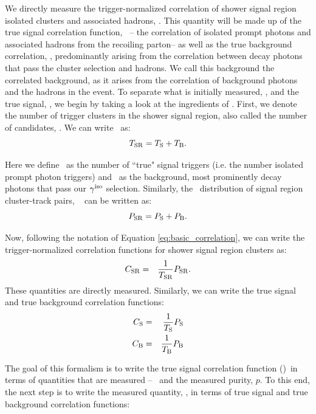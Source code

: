 We directly measure the trigger-normalized correlation of shower signal region isolated clusters and associated hadrons, \CSR. This quantity will be made up of the true signal correlation function, \CS~-- the correlation of isolated prompt photons and associated hadrons from the recoiling parton-- as well as the true background correlation, \CB, predominantly arising from the correlation between decay photons that pass the cluster selection and hadrons. We call this background the correlated background, as it arises from the correlation of background photons and the hadrons in the event. To separate what is initially measured, \CSR, and the true signal, \CS, we begin by taking a look at the ingredients of \CSR. First, we denote the number of trigger clusters in the shower signal region, also called the number of \gammaiso candidates, \TSR. We can write \TSR~as:
\begin{equation}
\label{eq:TS_TB}
T_{\mathrm{SR}} = T_{\mathrm{S}} + T_{\mathrm{B}}.
\end{equation}

Here we define \TS~as the number of ``true" signal triggers (i.e. the number isolated prompt photon triggers) and \TB~as the background, most prominently decay photons that pass our $\gamma^\mathrm{iso}$ selection. Similarly, the \deltaphi~distribution of signal region cluster-track pairs, \PSR~ can be written as:
\begin{equation}
\label{eq:PS_PB}
P_{\mathrm{SR}} = P_{\mathrm{S}} + P_{\mathrm{B}}.
\end{equation}

Now, following the notation of Equation \ref{eq:basic_correlation}, we can write the  trigger-normalized correlation functions for shower signal region clusters as:
\begin{eqnarray}
\label{eq:CSR}
C_{\mathrm{SR}} &=& \frac{1}{T_{\mathrm{SR}}}P_{\mathrm{SR}}.
\end{eqnarray}
These quantities are directly measured. Similarly, we can write the true signal and true background correlation functions:
\begin{eqnarray}
C_{\mathrm{S}} &=& \frac{1}{T_{\mathrm{S}}}P_{\mathrm{S}}\\\label{eq:CS}
C_{\mathrm{B}} &=& \frac{1}{T_{\mathrm{B}}}P_{\mathrm{B}}\label{eq:CB}
\end{eqnarray}

The goal of this formalism is to write the true signal correlation function (\CS)~in terms of quantities that are measured --  \CSR~and the measured purity, $p$. To this end, the next step is to write the measured quantity, \CSR, in terms of true signal and true background correlation functions:
 
